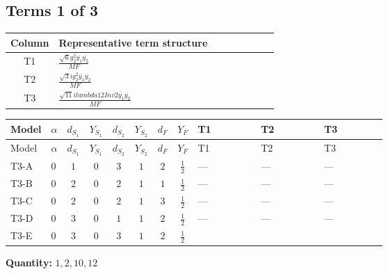 \documentclass[8pt]{article}
\begin{document}
\begin{landscape}
\subsection*{Terms 1 of 3}
\begin{center}
\begin{tabular}{@{}c >{\raggedright\arraybackslash}p{0.82\linewidth}@{}}
\toprule
Column & Representative term structure \\
\midrule
T1 & \(\displaystyle \frac{\sqrt{6} g_{2}^{2} \overline{y_{1}} \overline{y_{2}}}{MF}\) \\
\midrule
T2 & \(\displaystyle \frac{\sqrt{3} i g_{2}^{2} \overline{y_{1}} \overline{y_{2}}}{MF}\) \\
\midrule
T3 & \(\displaystyle \frac{\sqrt{11} i lambda12Inv2 \overline{y_{1}} \overline{y_{2}}}{MF}\) \\
\midrule
\bottomrule
\end{tabular}
\end{center}
\smallskip
\tiny
\begin{longtable}{@{}llcccccc >{\raggedright\arraybackslash}p{0.21\linewidth} >{\raggedright\arraybackslash}p{0.21\linewidth} >{\raggedright\arraybackslash}p{0.21\linewidth}@{}}
\toprule
Model & $\alpha$ & $d_{S_1}$ & $Y_{S_1}$ & $d_{S_2}$ & $Y_{S_2}$ & $d_F$ & $Y_F$ & T1 & T2 & T3 \\
\midrule
\endfirsthead
\toprule
Model & $\alpha$ & $d_{S_1}$ & $Y_{S_1}$ & $d_{S_2}$ & $Y_{S_2}$ & $d_F$ & $Y_F$ & T1 & T2 & T3 \\
\midrule
\endhead
T3-A & $0$ & $1$ & $0$ & $3$ & $1$ & $2$ & $\frac{1}{2}$ & --- & --- & --- \\
\midrule
T3-B & $0$ & $2$ & $0$ & $2$ & $1$ & $1$ & $\frac{1}{2}$ & --- & --- & --- \\
\midrule
T3-C & $0$ & $2$ & $0$ & $2$ & $1$ & $3$ & $\frac{1}{2}$ & --- & --- & --- \\
\midrule
T3-D & $0$ & $3$ & $0$ & $1$ & $1$ & $2$ & $\frac{1}{2}$ & --- & --- & --- \\
\midrule
T3-E & $0$ & $3$ & $0$ & $3$ & $1$ & $2$ & $\frac{1}{2}$ & \scriptsize\adjustbox{max width=\linewidth}{$\begin{gathered} - \frac{\sqrt{6} g_{2}^{2} \overline{y_{1}} \overline{y_{2}}}{6 MF}\end{gathered}$} & \scriptsize\adjustbox{max width=\linewidth}{$\begin{gathered} - \frac{15 \sqrt{3} i g_{2}^{2} \overline{y_{1}} \overline{y_{2}}}{8 MF}\end{gathered}$} & \scriptsize\adjustbox{max width=\linewidth}{$\begin{gathered} - \frac{3 \sqrt{11} i lambda12Inv2 \overline{y_{1}} \overline{y_{2}}}{22 MF}\end{gathered}$} \\
\midrule
\bottomrule
\end{longtable}
\clearpage
\noindent\textbf{Quantity: }$\mathrm{1,2,10,12}$\par\smallskip

\end{landscape}
\end{document}
